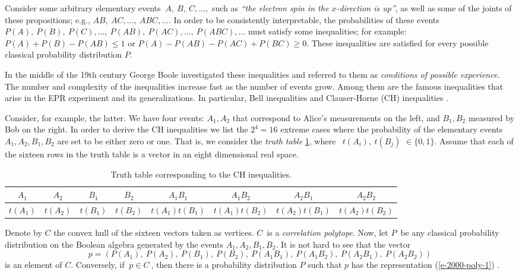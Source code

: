 Consider some arbitrary elementary events $\ A,\ B,\ C,\ldots ,$
such as {\em ``the electron spin in the $x$-direction is up''}, as well as
some of the joints of these propositions; e.g.,
$AB,\ AC,\ldots,\ ABC,\ldots $.
In order to be consistently interpretable,
the probabilities of these events\ $P(A),\ P(B),\
P(C),\ldots ,\ P(AB),\ P(AC),\ldots,\ P(ABC),\ldots$
must satisfy some inequalities; for example: $P(A)+P(B)-P(AB)\leq 1$
or  $P(A)-P(AB)-P(AC)+P(BC)\geq 0$.
These inequalities are satisfied  for every
possible classical probability distribution $P$.

In the middle of the 19th century George Boole \cite{Boole,Boole-62,Hailperin,pitowsky,Pit-94}
investigated
these inequalities
and referred to them as {\em conditions of possible experience. }
The number and complexity of the inequalities increase
fast as the number of events grow.
Among
them are the famous
inequalities that arise in the EPR experiment and its generalizations. In
particular,
Bell inequalities and Clauser-Horne (CH) inequalities \cite{bell,wigner-70,cl-horne,clauser}.

Consider, for example, the latter. We have four events: $A_{1},A_{2}$ that
correspond to Alice's
measurements on the left, and $B_{1},B_{2}$ measured by Bob on the right.
In order to derive the
CH inequalities we list the $2^4=16$ extreme cases where the probability of
the
elementary events $A_{1},A_{2},B_{1},B_{2}$ are set to be either zero or
one.
That is,
we consider the {\em truth table} \ref{t-tt-2000-poly},
where \ $t(A_{i}),\ t(B_{j})$ $\in \{0,1\}$. Assume that each of the sixteen
rows in the truth table is
a vector in an eight dimensional real space.
\begin{table}
\caption{Truth table corresponding to the CH inequalities. \label{t-tt-2000-poly}}
\begin{tabular}{cccccccc}
\hline\hline
$A_{1}$ & $A_{2}$ & $B_{1}$ & $B_{2}$&
$A_{1}B_{1}$& $A_{1}B_{2}$ &$A_{2}B_{1}$ & $A_{2}B_{2}$ \\
\hline
$t(A_{1})$ & $t(A_{2})$ & $t(B_{1})$ & $t(B_{2})$&
$t(A_{1})t(B_{1})$& $t(A_{1})t(B_{2})$ & $t(A_{2})t(B_{1})$ & $t(A_{2})t(B_{2})$ \\
\hline\hline
\end{tabular}
\end{table}
Denote by $C$ the convex
hull of the sixteen
vectors taken as vertices. $C$\ is a {\em correlation polytope}. Now, let
$P$\ be any classical probability
distribution on the Boolean algebra generated by the events $
A_{1},A_{2},B_{1},B_{2} $.
It is not hard to
see that the vector
\begin{equation}
p=(P(A_{1}),\ P(A_{2}),\ P(B_{1}),\ P(B_{2}),\ P(A_{1}B_{1}),\
P(A_{1}B_{2}),\ P(A_{2}B_{1}),\ P(A_{2}B_{2}))
\label{e-2000-poly-1}
\end{equation}
is an element of $C$.
Conversely, if $\ p\in C\ $, then there is a
probability distribution $P$ such
that $p$ has the representation (\ref{e-2000-poly-1}) \cite{pitowsky}.

